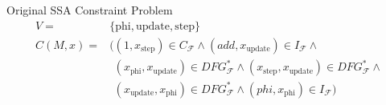 \centering
\begin{blackwhitebox}{Original SSA Constraint Problem}
    \setlength{\abovedisplayskip}{0pt}
    \setlength{\belowdisplayskip}{0pt}
    \vspace{-0.5em}
\begin{align*}
        V={}&\{\text{phi}, \text{update}, \text{step}\}\\
        C(M,x)={}&    ((1,x_\text{step})
                        \in C_\mathcal{F}\mathrel\land
                       (add,x_\text{update})
                        \in I_\mathcal{F}\mathrel\land\\
           &\phantom{(}(x_\text{phi},x_\text{update})
                        \in DFG_\mathcal{F}^*\mathrel\land
                       (x_\text{step},x_\text{update})
                        \in DFG_\mathcal{F}^*\mathrel\land\\
           &\phantom{(}(x_\text{update},x_\text{phi})
                        \in DFG_\mathcal{F}^*\mathrel\land
                       (phi,x_\text{phi})
                        \in I_\mathcal{F})
    \end{align*}
\end{blackwhitebox}

